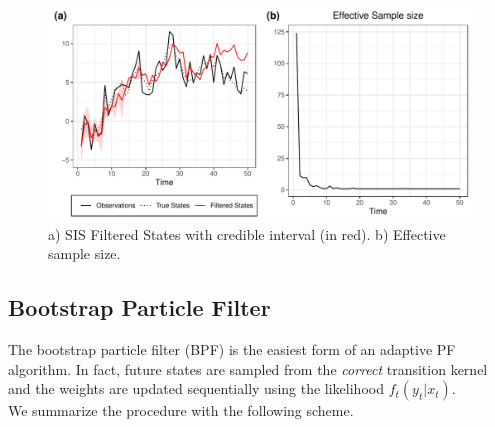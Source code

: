 \documentclass[
]{book}
\theoremstyle{break}
\theoremstyle{nonumberplain}
\begin{document}
\begin{figure}[H]

{\centering \includegraphics{prova_knit_finale_files/figure-latex/unnamed-chunk-8-1} 

}

\caption{a) SIS Filtered States with credible interval (in red). b) Effective sample size.}\label{fig:unnamed-chunk-8}
\end{figure}

\subsection{Bootstrap Particle Filter}

The bootstrap particle filter (BPF) is the easiest form of an adaptive
PF algorithm. In fact, future states are sampled from the
\textit{correct} transition kernel and the weights are updated
sequentially using the likelihood \(f_t(y_t|x_t)\).\\
We summarize the procedure with the following scheme.
\end{document}
